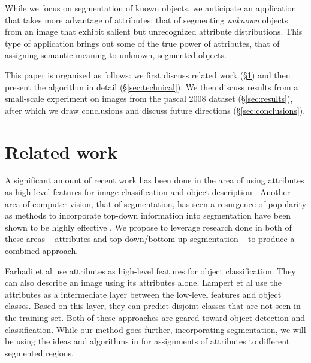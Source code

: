 \documentclass[10pt,twocolumn,letterpaper]{article}
\begin{document}
While we focus on segmentation of known objects, we anticipate an application
that takes more advantage of attributes: that of segmenting \emph{unknown}
objects from an image that exhibit salient but unrecognized attribute
distributions.  This type of application brings out some of the true power of
attributes, that of assigning semantic meaning to unknown, segmented objects.

This paper is organized as follows: we first discuss related work (\S \ref{sec:related_work})
and then present the algorithm in detail (\S \ref{sec:technical}).  We then discuss results from
a small-scale experiment on images from the pascal 2008 dataset (\S \ref{sec:results}), after which we draw
conclusions and discuss future directions (\S \ref{sec:conclusions}).

\section{Related work}
\label{sec:related_work}
A significant amount of recent work has been done in the area of using
attributes as high-level features for image classification and object
description \cite{farhadi09, lampert09, kumar09}.  
Another area of computer vision, that of segmentation,
has seen a resurgence of popularity as methods to incorporate top-down
information into segmentation have been shown to be highly effective
\cite{borenstein04, pantofaru, gu09, russell06, malisiewicz, leibe04, hoiem05, shotton06}.  
We propose to leverage research done in both of these areas -- attributes
and top-down/bottom-up segmentation -- to produce a combined approach.

Farhadi et al
\cite{farhadi09} use attributes as high-level features for object classification. They
can also describe an image using its attributes alone.
Lampert et al \cite{lampert09}
use the attributes as a intermediate layer between the low-level
features and object classes. Based on this layer, they can predict
disjoint classes that are not seen in the training set.  Both of these
approaches are geared toward object detection and classification.  While
our method goes further, incorporating segmentation, we will be using
the ideas and algorithms in \cite{farhadi09} for assignments of 
attributes to different segmented regions.
\end{document}
